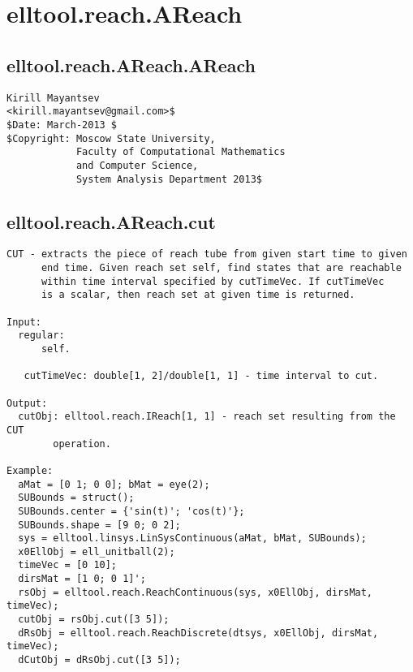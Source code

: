 \section{elltool.reach.AReach}\label{secClassDescr:elltool.reach.AReach}
\subsection{\texorpdfstring{elltool.reach.AReach.AReach}{AReach}}\label{method:elltool.reach.AReach.AReach}
\begin{verbatim}
Kirill Mayantsev
<kirill.mayantsev@gmail.com>$
$Date: March-2013 $
$Copyright: Moscow State University,
            Faculty of Computational Mathematics
            and Computer Science,
            System Analysis Department 2013$
\end{verbatim}
\subsection{\texorpdfstring{elltool.reach.AReach.cut}{cut}}\label{method:elltool.reach.AReach.cut}
\begin{verbatim}
CUT - extracts the piece of reach tube from given start time to given
      end time. Given reach set self, find states that are reachable
      within time interval specified by cutTimeVec. If cutTimeVec
      is a scalar, then reach set at given time is returned.

Input:
  regular:
      self.

   cutTimeVec: double[1, 2]/double[1, 1] - time interval to cut.

Output:
  cutObj: elltool.reach.IReach[1, 1] - reach set resulting from the CUT
        operation.

Example:
  aMat = [0 1; 0 0]; bMat = eye(2);
  SUBounds = struct();
  SUBounds.center = {'sin(t)'; 'cos(t)'};
  SUBounds.shape = [9 0; 0 2];
  sys = elltool.linsys.LinSysContinuous(aMat, bMat, SUBounds);
  x0EllObj = ell_unitball(2);
  timeVec = [0 10];
  dirsMat = [1 0; 0 1]';
  rsObj = elltool.reach.ReachContinuous(sys, x0EllObj, dirsMat, timeVec);
  cutObj = rsObj.cut([3 5]);
  dRsObj = elltool.reach.ReachDiscrete(dtsys, x0EllObj, dirsMat, timeVec);
  dCutObj = dRsObj.cut([3 5]);
\end{verbatim}
